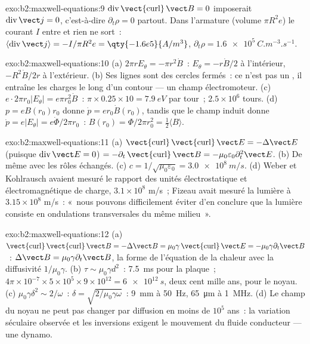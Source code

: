 \begin{solution}{exo:b2:maxwell-equations:9}
$\operatorname{div}\operatorname{\vect{curl}}\vect B = 0$ imposerait $\operatorname{div}\vect j =
0$, c'est-à-dire $\partial_t\rho = 0$ partout. Dans l'armature (volume $\pi R^2e$) le
courant $I$ entre et rien ne sort~: $\langle\operatorname{div}\vect j\rangle =
-I/\pi R^2e = \qty{-1.6e5}{A/m^3}$, $\partial_t\rho = \qty{+1.6e5}{C.m^{-3}.s^{-1}}$.
\end{solution}

\begin{solution}{exo:b2:maxwell-equations:10}
(a) $2\pi rE_\theta = -\pi r^2\dot B$~: $E_\theta = -r\dot B/2$ à l'intérieur, $-R^2\dot B/2r$
à l'extérieur. (b) Ses lignes sont des cercles fermés~: ce n'est pas un , il
entraîne les charges le long d'un contour --- un champ électromoteur. (c) $e\cdot2\pi r_0
|E_\theta| = e\pi r_0^2\dot B$~: $\pi \times 0.25 \times 10 = \qty{7.9}{eV}$ par tour~; $2.5 \times 10^6$
tours. (d) $p = eB(r_0)r_0$ donne $\dot p = er_0\dot B(r_0)$, tandis que le champ
induit donne $\dot p = e|E_\theta| = e\dot\Phi/2\pi r_0$~: $B(r_0) = \Phi/2\pi r_0^2 =
\tfrac12\langle B\rangle$.
\end{solution}

\begin{solution}{exo:b2:maxwell-equations:11}
(a) $\operatorname{\vect{curl}}\operatorname{\vect{curl}}\vect E = -\Delta\vect E$ (puisque $\operatorname{div}
\vect E = 0$) $= -\partial_t\operatorname{\vect{curl}}\vect B = -\mu_0\varepsilon_0\partial_t^2\vect E$. (b)
De même avec les rôles échangés. (c) $c = 1/\sqrt{\mu_0\varepsilon_0} = \qty{3.0e8}{m/s}$.
(d) Weber et Kohlrausch avaient mesuré le rapport des unités électrostatique
et électromagnétique de charge, $3.1 \times 10^8$ m/s~; Fizeau avait
mesuré la lumière à $3.15 \times 10^8$ m/s~: «~nous pouvons difficilement éviter
d'en conclure que la lumière consiste en ondulations transversales du
même milieu~».
\end{solution}

\begin{solution}{exo:b2:maxwell-equations:12}
(a) $\operatorname{\vect{curl}}\operatorname{\vect{curl}}\vect B = -\Delta\vect B = \mu_0\gamma\operatorname{\vect{curl}}
\vect E = -\mu_0\gamma\partial_t\vect B$~: $\Delta\vect B = \mu_0\gamma\partial_t\vect B$, la forme de
l'équation de la chaleur avec la diffusivité $1/\mu_0\gamma$. (b) $\tau \sim \mu_0\gamma d^2$~: \qty{7.5}{ms}
pour la plaque~; $4\pi \times 10^{-7} \times 5 \times 10^5 \times 9 \times 10^{12} = \qty{6e12}{s}$, deux cent
mille ans, pour le noyau. (c) $\mu_0\gamma\delta^2 \sim 2/\omega$~: $\delta = \sqrt{2/\mu_0
\gamma\omega}$~: \qty{9}{mm} à \qty{50}{Hz}, \qty{65}{\micro m} à \qty{1}{MHz}. (d) Le champ
du noyau ne peut pas changer par diffusion en moins de $10^5$ ans~: la
variation séculaire observée et les inversions exigent le mouvement du
fluide conducteur --- une dynamo.
\end{solution}

